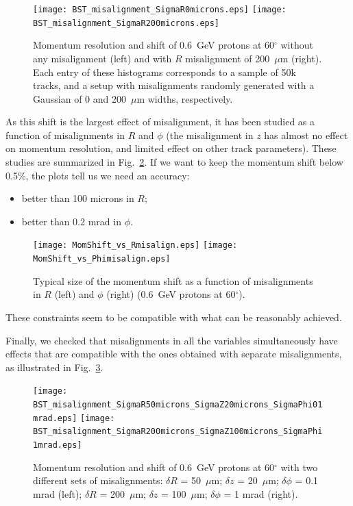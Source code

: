 \begin{figure}[ht!]
\centering
\texttt{[image: BST\_misalignment\_SigmaR0microns.eps]}
\texttt{[image: BST\_misalignment\_SigmaR200microns.eps]}
\caption{\small{Momentum resolution and shift of 0.6~GeV protons at 60$^\circ$ 
without any misalignment (left) and with $R$ misalignment of 200~$\mu$m (right). 
Each entry of these histograms corresponds to a sample of 50k tracks, and a setup 
with misalignments randomly generated with a Gaussian of 0 and 200~$\mu$m widths,
respectively.}}
\label{sec_central:pic_misalignR}
\end{figure}

As this shift is the largest effect of misalignment, it has been studied as a 
function of misalignments in $R$ and $\phi$ (the misalignment in $z$ has almost no 
effect on momentum resolution, and limited effect on other track parameters).  These 
studies are summarized in Fig.~\ref{sec_central:pic_misalignRPhi}.  If we want to 
keep the momentum shift below 0.5\%, the plots tell us we need an accuracy:

\begin{itemize}
\item better than 100 microns in $R$;
\item better than 0.2 mrad in $\phi$.
\end{itemize}

\begin{figure}[ht!]
\centering
\texttt{[image: MomShift\_vs\_Rmisalign.eps]}
\texttt{[image: MomShift\_vs\_Phimisalign.eps]}
\caption{\small{Typical size of the momentum shift as a function of misalignments in 
$R$ (left) and $\phi$ (right) (0.6~GeV protons at 60$^\circ$).}}
\label{sec_central:pic_misalignRPhi}
\end{figure}

\noindent
These constraints seem to be compatible with what can be reasonably achieved.

Finally, we checked that misalignments in all the variables simultaneously have 
effects that are compatible with the ones obtained with separate misalignments, as 
illustrated in Fig.~\ref{sec_central:pic_misalignRZPhi}.

\begin{figure}[ht!]
\centering
\texttt{[image: BST\_misalignment\_SigmaR50microns\_SigmaZ20microns\_SigmaPhi01mrad.eps]}
\texttt{[image: BST\_misalignment\_SigmaR200microns\_SigmaZ100microns\_SigmaPhi1mrad.eps]}
\caption{\small{Momentum resolution and shift of 0.6~GeV protons at 60$^\circ$ with 
two different sets of misalignments: $\delta$$R$ = 50~$\mu$m; $\delta$$z$ = 20~$\mu$m; 
$\delta$$\phi$ = 0.1 mrad (left); $\delta$$R$ = 200~$\mu$m; $\delta$$z$ = 100~$\mu$m; 
$\delta$$\phi$ = 1 mrad (right).}}
\label{sec_central:pic_misalignRZPhi}
\end{figure}

